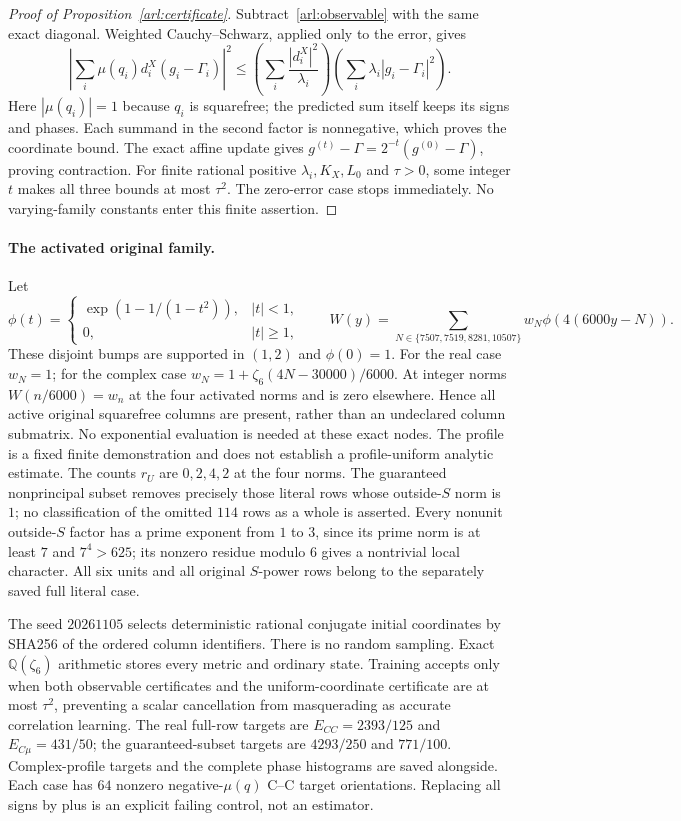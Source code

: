 \documentclass[11pt,oneside,openany]{book}
\theoremstyle{definition}\newtheorem{definition}[theorem]{Definition}
\theoremstyle{remark}\newtheorem{remark}[theorem]{Remark}
\begin{document}
\begin{proof}[Proof of Proposition~\ref{arl:certificate}]
Subtract~\eqref{arl:observable} with the same exact diagonal. Weighted
Cauchy--Schwarz, applied only to the error, gives
\[
 \left|\sum_i\mu(q_i)d_i^X(g_i-\Gamma_i)\right|^2
 \le\left(\sum_i\frac{|d_i^X|^2}{\lambda_i}\right)
     \left(\sum_i\lambda_i|g_i-\Gamma_i|^2\right).
\]
Here $|\mu(q_i)|=1$ because $q_i$ is squarefree; the predicted sum itself
keeps its signs and phases. Each summand in the second factor is nonnegative,
which proves the coordinate bound. The exact affine update gives
$g^{(t)}-\Gamma=2^{-t}(g^{(0)}-\Gamma)$, proving contraction.
For finite rational positive $\lambda_i,K_X,L_0$ and $\tau>0$, some integer
$t$ makes all three bounds at most $\tau^2$. The zero-error case stops
immediately. No varying-family constants enter this finite assertion.
\end{proof}

\paragraph{The activated original family.}
Let
\[
 \phi(t)=\begin{cases}\exp(1-1/(1-t^2)),&|t|<1,\\0,&|t|\ge1,\end{cases}
 \qquad W(y)=\sum_{N\in\{7507,7519,8281,10507\}}
                     w_N\phi(4(6000y-N)).
\]
These disjoint bumps are supported in $(1,2)$ and $\phi(0)=1$.
For the real case $w_N=1$; for the complex case
$w_N=1+\zeta_6(4N-30000)/6000$.
At integer norms $W(n/6000)=w_n$ at the four activated norms and is zero
elsewhere. Hence all active original squarefree columns are present, rather
than an undeclared column submatrix. No exponential evaluation is needed
at these exact nodes. The profile is a fixed finite demonstration and does
not establish a profile-uniform analytic estimate.
The counts $r_U$ are $0,2,4,2$ at the four norms.
The guaranteed nonprincipal subset removes precisely those literal rows whose
outside-$S$ norm is $1$; no classification of the omitted $114$ rows as a
whole is asserted. Every nonunit outside-$S$ factor has a prime exponent
from $1$ to $3$, since its prime norm is at least $7$ and $7^4>625$;
its nonzero residue modulo $6$ gives a nontrivial local character.
All six units and all original $S$-power rows belong to
the separately saved full literal case.

The seed $20261105$ selects deterministic rational conjugate initial
coordinates by SHA256 of the ordered column identifiers. There is no random
sampling. Exact $\mathbb Q(\zeta_6)$ arithmetic stores every metric and
ordinary state. Training accepts only when both observable certificates and
the uniform-coordinate certificate are at most $\tau^2$, preventing a
scalar cancellation from masquerading as accurate correlation learning.
The real full-row targets are $E_{CC}=2393/125$ and $E_{C\mu}=431/50$;
the guaranteed-subset targets are $4293/250$ and $771/100$.
Complex-profile targets and the complete phase histograms are saved alongside.
Each case has $64$ nonzero negative-$\mu(q)$ C--C target orientations.
Replacing all signs by plus is an explicit failing control, not an estimator.
\end{document}
